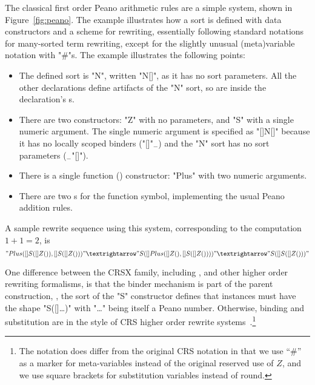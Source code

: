 \documentclass[letterpaper,11pt]{article}
\begin{document}
\begin{example}[Peano]\label{ex:peano}
  The classical first order Peano arithmetic rules are a simple \hax system, shown in
  Figure~\ref{fig:peano}.  The example illustrates how a sort is defined with data constructors and
  a scheme for rewriting, essentially following standard notations for many-sorted term rewriting,
  except for the slightly unusual (meta)variable notation with "#"s. The example illustrates the
  following points:
  \begin{itemize}

  \item The defined sort is "N", written "N[]", as it has no sort parameters. All the other
    declarations define artifacts of the "N" sort, so are inside the  declaration's
    \kw{\{\}}s.

  \item There are two  constructors: "Z" with no parameters, and "S" with a single numeric
    argument. The single numeric argument is specified as "[]N[]" because it has no locally scoped
    binders ("[]"$_-$) and the "N" sort has no sort parameters ($_-$"[]").

  \item There is a single function () constructor: "Plus" with two numeric arguments.

  \item There are two s for the function symbol, implementing the usual Peano addition rules.

  \end{itemize}
  A sample rewrite sequence using this system, corresponding to the computation $1+1=2$, is
  \begin{displaymath}
    "Plus([]S([]Z()), []S([]Z()))" →
    "S([]Plus([]Z(), []S([]Z())))" →
    "S([]S([]Z()))"
  \end{displaymath}
\end{example}

\begin{remark}
  One difference between the CRSX family, including \hax, and other higher order rewriting
  formalisms, is that the binder mechanism is part of the parent construction, \eg, the sort of the
  "S" constructor defines that instances must have the shape "S([]…)" with "…" being itself a Peano
  number.  Otherwise, binding and substitution are in the style of CRS higher order rewrite
  systems~\cite{Klop+:tcs1993}.\footnote{The notation does differ from the original CRS notation in
    that we use ``\#'' as a marker for meta-variables instead of the original reserved use of $Z$,
    and we use square brackets for substitution variables instead of round.}
\end{remark}
\end{document}
